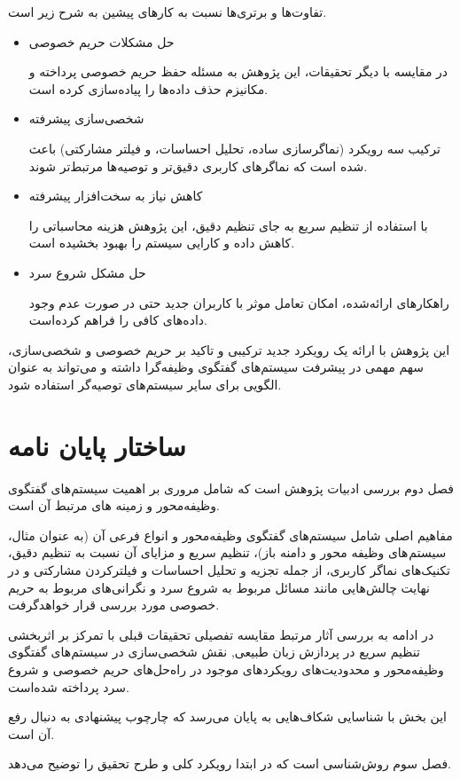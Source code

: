 تفاوت‌ها و برتری‌ها نسبت به کارهای پیشین به شرح زیر است.
\begin{itemize}
\item
حل مشکلات حریم خصوصی

در مقایسه با دیگر تحقیقات، این پژوهش به مسئله حفظ حریم خصوصی پرداخته و مکانیزم حذف داده‌ها را پیاده‌سازی کرده است.
\item
شخصی‌سازی پیشرفته

ترکیب سه رویکرد (نماگر‌سازی ساده، تحلیل احساسات، و فیلتر مشارکتی) باعث شده است که نماگر‌های کاربری دقیق‌تر و توصیه‌ها مرتبط‌تر شوند.
\item
کاهش نیاز به سخت‌افزار پیشرفته

با استفاده از تنظیم سریع به جای تنظیم دقیق، این پژوهش هزینه محاسباتی را کاهش داده و کارایی سیستم را بهبود بخشیده است.
\item
حل مشکل شروع سرد

راهکارهای ارائه‌شده، امکان تعامل موثر با کاربران جدید حتی در صورت عدم وجود داده‌های کافی را فراهم کرده‌است.
\end{itemize}

این پژوهش با ارائه یک رویکرد جدید ترکیبی و تاکید بر حریم خصوصی و شخصی‌سازی، سهم مهمی در پیشرفت سیستم‌های گفتگوی وظیفه‌گرا داشته و می‌تواند به عنوان الگویی برای سایر سیستم‌های توصیه‌گر استفاده شود.



\section{ساختار پایان نامه}

فصل دوم بررسی ادبیات پژوهش است که شامل مروری بر اهمیت  سیستم‌های گفتگوی وظیفه‌محور و زمینه های مرتبط آن است.

مفاهیم اصلی شامل سیستم‌های گفتگوی وظیفه‌محور و انواع فرعی آن (به عنوان مثال، سیستم های وظیفه محور و دامنه باز)، تنظیم سریع و مزایای آن نسبت به تنظیم دقیق، تکنیک‌های نماگر کاربری، از جمله تجزیه و تحلیل احساسات و فیلتر‌کردن مشارکتی و در نهایت چالش‌هایی مانند مسائل مربوط به شروع سرد و نگرانی‌های مربوط به حریم خصوصی مورد بررسی قرار خواهد‌گرفت.

در ادامه به بررسی آثار مرتبط مقایسه تفصیلی تحقیقات قبلی با تمرکز بر اثربخشی تنظیم سریع در پردازش زبان طبیعی, نقش شخصی‌سازی در  سیستم‌های گفتگوی وظیفه‌محور و محدودیت‌های رویکردهای موجود در راه‌حل‌های حریم خصوصی و شروع سرد پرداخته شده‌است.

این بخش با شناسایی شکاف‌هایی به پایان می‌رسد که چارچوب پیشنهادی به دنبال رفع آن است.

فصل سوم روش‌شناسی است که در ابتدا رویکرد کلی و طرح تحقیق را توضیح می‌دهد.

